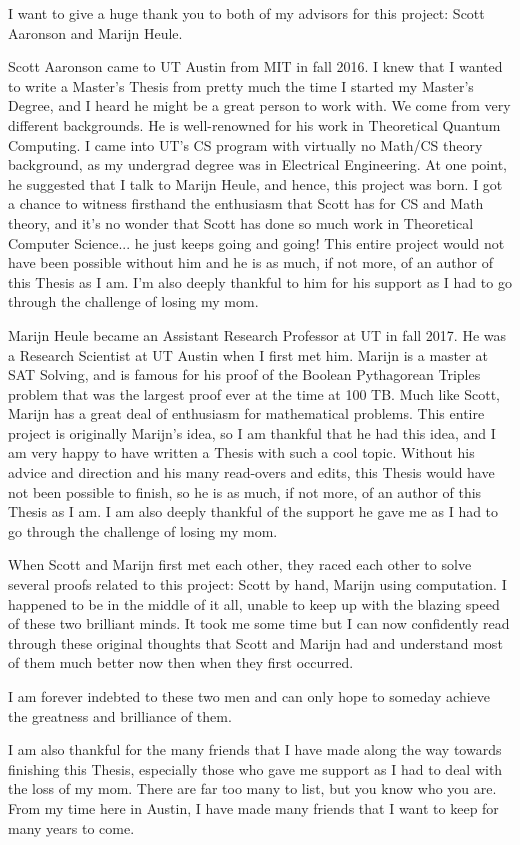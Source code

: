 \documentclass[12pt]{report}	%
\begin{document}
\begin{acknowledgments}		%
%
I want to give a huge thank you to both of my advisors for this project: Scott Aaronson and Marijn Heule. \par
Scott Aaronson came to UT Austin from MIT in fall 2016. I knew that I wanted to write a Master's Thesis from pretty much the time I started my Master's Degree, and I heard he might be a great person to work with. We come from very different backgrounds. He is well-renowned for his work in Theoretical Quantum Computing. I came into UT's CS program with virtually no Math/CS theory background, as my undergrad degree was in Electrical Engineering. At one point, he suggested that I talk to Marijn Heule, and hence, this project was born. I got a chance to witness firsthand the enthusiasm that Scott has for CS and Math theory, and it's no wonder that Scott has done so much work in Theoretical Computer Science... he just keeps going and going! This entire project would not have been possible without him and he is as much, if not more, of an author of this Thesis as I am. I'm also deeply thankful to him for his support as I had to go through the challenge of losing my mom.\par
Marijn Heule became an Assistant Research Professor at UT in fall 2017. He was a Research Scientist at UT Austin when I first met him. Marijn is a master at SAT Solving, and is famous for his proof of the Boolean Pythagorean Triples problem that was the largest proof ever at the time at 100 TB. Much like Scott, Marijn has a great deal of enthusiasm for mathematical problems. This entire project is originally Marijn's idea, so I am thankful that he had this idea, and I am very happy to have written a Thesis with such a cool topic. Without his advice and direction and his many read-overs and edits, this Thesis would have not been possible to finish, so he is as much, if not more, of an author of this Thesis as I am. I am also deeply thankful of the support he gave me as I had to go through the challenge of losing my mom.\par
When Scott and Marijn first met each other, they raced each other to solve several proofs related to this project: Scott by hand, Marijn using computation. I happened to be in the middle of it all, unable to keep up with the blazing speed of these two brilliant minds. It took me some time but I can now confidently read through these original thoughts that Scott and Marijn had and understand most of them much better now then when they first occurred. \par
I am forever indebted to these two men and can only hope to someday achieve the greatness and brilliance of them. \par
I am also thankful for the many friends that I have made along the way towards finishing this Thesis, especially those who gave me support as I had to deal with the loss of my mom. There are far too many to list, but you know who you are. From my time here in Austin, I have made many friends that I want to keep for many years to come.
\end{acknowledgments}
\end{document}
